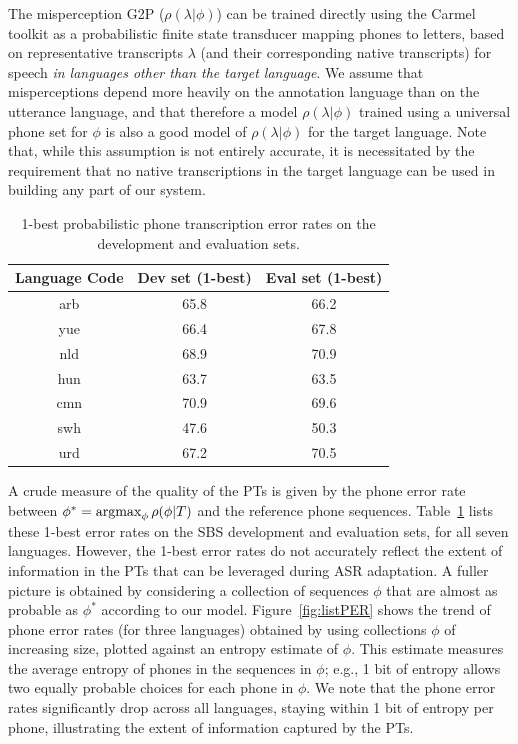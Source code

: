 The misperception G2P ($\rho(\lambda|\phi)$) can be trained directly 
using the Carmel toolkit
\cite{Carmel} as a probabilistic finite state transducer mapping
phones to letters, based on representative transcripts $\lambda$ (and
their corresponding native transcripts) for speech {\em in languages
other than the target language}. We assume that misperceptions
depend more heavily on the annotation language than on the utterance
language, and that therefore a model $\rho(\lambda|\phi)$ trained
using a universal phone set for $\phi$ is also a good model of
$\rho(\lambda|\phi)$ for the target language. Note that, while this
assumption is not entirely accurate, it is necessitated by the
requirement that no native transcriptions in the target language can
be used in building any part of our system.

\begin{table}[t]
\centering
\begin{tabular}{| c || c | c |}
\hline
Language Code & Dev set (1-best) & Eval set (1-best) \\
\hline
arb & 65.8 & 66.2 \\
yue & 66.4 & 67.8 \\
nld & 68.9 & 70.9 \\
hun & 63.7 & 63.5 \\
cmn & 70.9 & 69.6 \\
swh & 47.6 & 50.3 \\
urd & 67.2 & 70.5  \\
\hline
\end{tabular}
\caption{1-best probabilistic phone transcription error rates on the development and evaluation sets.}
\label{tab:LPER}
\end{table}

A crude measure of the quality of the PTs is given by the phone error
rate between $\phi^* = \operatorname*{argmax}_{\phi} \rho(\phi|T)$ and the reference
phone sequences. Table~\ref{tab:LPER} lists these 1-best error rates
on the SBS development and evaluation sets, for all seven
languages. However, the 1-best error rates do not accurately reflect
the extent of information in the PTs that can be leveraged during ASR
adaptation. A fuller picture is obtained by considering a collection
of sequences $\phi$ that are almost as probable as $\phi^*$ according
to our model. Figure~\ref{fig:listPER} shows the trend of phone error
rates (for three languages) obtained by using collections $\phi$ of
increasing size, plotted against an entropy estimate of $\phi$. This
estimate measures the average entropy of phones in the sequences in
$\phi$; e.g., 1 bit of entropy allows two equally probable choices for
each phone in $\phi$. We note that the phone error rates significantly
drop across all languages, staying within 1 bit of entropy per phone,
illustrating the extent of information captured by the PTs.

